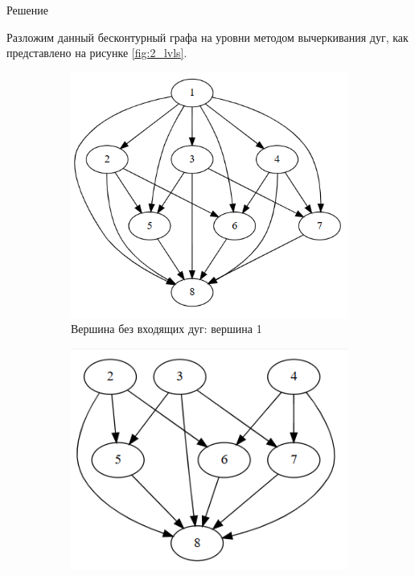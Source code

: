 \documentclass{article}
\begin{document}
\begin{enumerate}
\begin{center}
Решение 
\end{center}
Разложим данный бесконтурный графа на уровни методом вычеркивания дуг, как представлено на рисунке \ref{fig:2_lvls}.\\
\begin{figure}[ht]
     \centering
     \begin{subfigure}[b]{0.3\textwidth}
        \centering
         \includegraphics[width=\textwidth]{attachments/2/0.png}
         \caption*{\small{Вершина без входящих дуг: вершина 1}}
         \label{fig:2_0}
     \end{subfigure}
     \hfill
     \begin{subfigure}[b]{0.25\textwidth}
        \centering
         \includegraphics[width=\textwidth]{attachments/2/1.png}

\end{subfigure}
\end{figure}
\end{enumerate}
\end{document}
